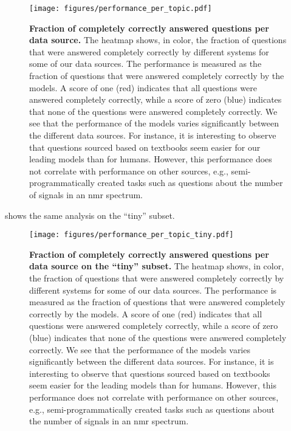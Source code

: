 \begin{figure}[htb]
    \centering
    \texttt{[image: figures/performance\_per\_topic.pdf]}
    \caption{\textbf{Fraction of completely correctly answered questions per data source.} The heatmap shows, in color, the fraction of questions that were answered completely correctly by different systems for some of our data sources. The performance is measured as the fraction of questions that were answered completely correctly by the models. A score of one (red) indicates that all questions were answered completely correctly, while a score of zero (blue) indicates that none of the questions were answered completely correctly.
        We see that the performance of the models varies significantly between the different data sources. For instance, it is interesting to observe that questions sourced based on textbooks seem easier for our leading models than for humans. However, this performance does not correlate with performance on other sources, e.g., semi-programmatically created tasks such as questions about the number of signals in an \gls{nmr} spectrum.
    }
    \label{fig:performance_per_topic}
\end{figure}

 shows the same analysis on the \enquote{tiny} subset. 


\begin{figure}[htb]
    \centering
    \texttt{[image: figures/performance\_per\_topic\_tiny.pdf]}
    \caption{\textbf{Fraction of completely correctly answered questions per data source on the \enquote{tiny} subset.} The heatmap shows, in color, the fraction of questions that were answered completely correctly by different systems for some of our data sources. The performance is measured as the fraction of questions that were answered completely correctly by the models. A score of one (red) indicates that all questions were answered completely correctly, while a score of zero (blue) indicates that none of the questions were answered completely correctly.
        We see that the performance of the models varies significantly between the different data sources. For instance, it is interesting to observe that questions sourced based on textbooks seem easier for the leading models than for humans. However, this performance does not correlate with performance on other sources, e.g., semi-programmatically created tasks such as questions about the number of signals in an \gls{nmr} spectrum.
    }
    \label{fig:performance_per_topic_tiny}
\end{figure}

